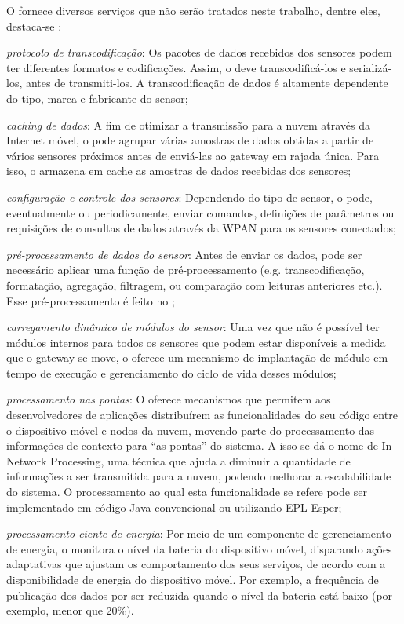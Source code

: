 O \mhub fornece diversos serviços que não serão tratados neste trabalho, dentre eles, destaca-se \cite{gomes:2017}:

\begin{alineas}
	\item \emph{protocolo de transcodificação}:
		Os pacotes de dados recebidos dos sensores podem ter diferentes formatos e codificações.  Assim, o \mhub deve transcodificá-los e serializá-los, antes de transmiti-los. A transcodificação de dados é altamente dependente do tipo, marca e fabricante do sensor;
		
	\item \emph{caching de dados}:
		A fim de otimizar a transmissão para a nuvem através da Internet móvel, o \mhub pode agrupar várias amostras de dados obtidas a partir de vários sensores próximos antes de enviá-las ao gateway em rajada única. Para isso, o \mhub armazena em cache as amostras de dados recebidas dos sensores;
		
	\item \emph{configuração e controle dos sensores}:
		Dependendo do tipo de sensor, o \mhub pode, eventualmente ou periodicamente, enviar comandos, definições de parâmetros ou requisições de consultas de dados através da WPAN para os sensores conectados;
		
	\item \emph{pré-processamento de dados do sensor}:
		Antes de enviar os dados, pode ser necessário aplicar uma função de pré-processamento (e.g.  transcodificação, formatação, agregação, filtragem, ou comparação com leituras anteriores etc.).  Esse pré-processamento é feito no \mhub;
		
	\item \emph{carregamento dinâmico de módulos do sensor}:
		Uma vez que não é possível ter módulos internos para todos os sensores que podem estar disponíveis a medida que o gateway se move, o \mhub oferece um mecanismo de implantação de módulo em tempo de execução e gerenciamento do ciclo de vida desses módulos;
		
	\item \emph{processamento nas pontas}:
		O \mhub oferece mecanismos que permitem aos desenvolvedores de aplicações distribuírem as funcionalidades do seu código entre o dispositivo móvel e nodos da nuvem, movendo parte do processamento das informações de contexto para “as pontas” do sistema. A isso se dá o nome de In-Network Processing, uma técnica que ajuda a diminuir a quantidade de informações a ser transmitida para a nuvem, podendo melhorar a escalabilidade do sistema. O processamento ao qual esta funcionalidade se refere pode ser implementado em código Java convencional ou utilizando EPL Esper;
		
	\item \emph{processamento ciente de energia}:
		Por meio de um componente de gerenciamento de energia, o \mhub monitora o nível da bateria do dispositivo móvel, disparando ações adaptativas que ajustam os comportamento dos seus serviços, de acordo com a disponibilidade de energia do dispositivo móvel. Por exemplo, a frequência de publicação dos dados por ser reduzida quando o nível da bateria está baixo (por exemplo, menor que 20\%).
\end{alineas}

